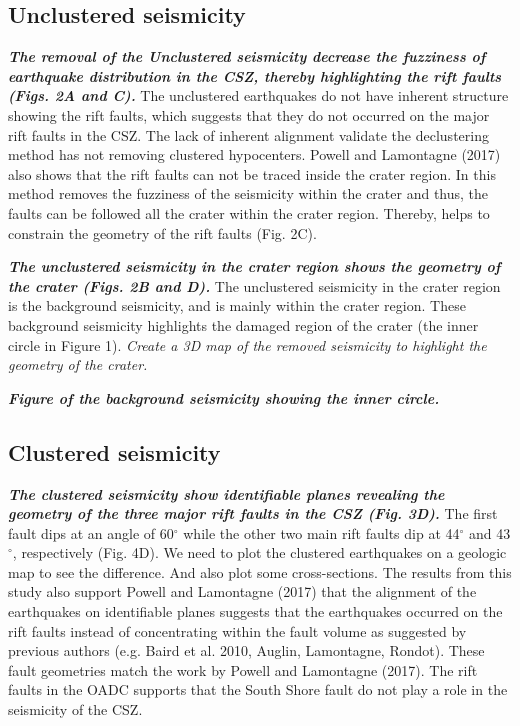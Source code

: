 \documentclass[draft]{agujournal2018}
\begin{document}
\subsection{Unclustered seismicity}
\textit{\textbf{The removal of the Unclustered seismicity decrease the fuzziness of earthquake distribution in the CSZ, thereby highlighting the rift faults (Figs. 2A and C).}} The unclustered earthquakes do not have inherent structure showing the rift faults, which suggests that they do not occurred on the major rift faults in the CSZ. The lack of inherent alignment validate the declustering method has not removing clustered hypocenters. Powell and Lamontagne (2017) also shows that the rift faults can not be traced inside the crater region. In this method removes the fuzziness of the seismicity within the crater and thus, the faults can be followed all the crater within the crater region. Thereby, helps to constrain the geometry of the rift faults (Fig. 2C).

\textit{\textbf{The unclustered seismicity in the crater region shows the geometry of the crater (Figs. 2B and D).}} The unclustered seismicity in the crater region is the background seismicity, and is mainly within the crater region. These background seismicity highlights the damaged region of the crater (the inner circle in Figure 1). \textit{Create a 3D map of the removed seismicity to highlight the geometry of the crater.}

\textbf{\textit{Figure of the background seismicity showing the inner circle.}}
 



\subsection{Clustered seismicity}
\textit{\textbf{The clustered seismicity show identifiable planes revealing the geometry of the three major rift faults in the CSZ (Fig. 3D).}} The first fault dips at an angle of 60$^\circ$ while the other two main rift faults dip at 44$^\circ$ and 43$^\circ$, respectively (Fig. 4D). We need to plot the clustered earthquakes on a geologic map to see the difference. And also plot some cross-sections. The results from this study also support Powell and Lamontagne (2017) that the alignment of the earthquakes on identifiable planes suggests that the earthquakes occurred on the rift faults instead of concentrating within the fault volume as suggested by previous authors (e.g. Baird et al. 2010, Auglin, Lamontagne, Rondot). These fault geometries match the work by Powell and Lamontagne (2017). The rift faults in the OADC supports that the South Shore fault do not play a role in the seismicity of the CSZ.
\end{document}
